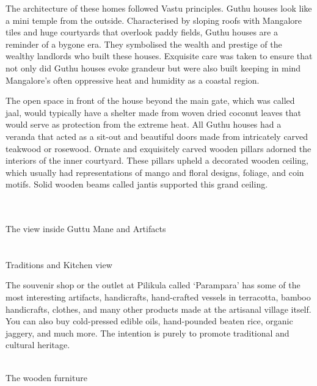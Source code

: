 \documentclass[12pt]{article}
\newcommand{\img}[2]{\scalebox{#1}{\texttt{[image: \#2]}}}
\begin{document}
	\par The architecture of these homes followed Vastu principles. Guthu houses look like a mini temple from the outside. Characterised by sloping roofs with Mangalore tiles and huge courtyards that overlook paddy fields, Guthu houses are a reminder of a bygone era. They symbolised the wealth and prestige of the wealthy landlords who built these houses. Exquisite care was taken to ensure that not only did Guthu houses evoke grandeur but were also built keeping in mind Mangalore’s often oppressive heat and humidity as a coastal region. \newpage

	\par  The open space in front of the house beyond the main gate, which was called jaal, would typically have a shelter made from woven dried coconut leaves that would serve as protection from the extreme heat. All Guthu houses had a veranda that acted as a sit-out and beautiful doors made from intricately carved teakwood or rosewood. Ornate and exquisitely carved wooden pillars adorned the interiors of the inner courtyard. These pillars upheld a decorated wooden ceiling, which usually had representations of mango and floral designs, foliage, and coin motifs. Solid wooden beams called jantis supported this grand ceiling.

	\begin{center}
		\img{.25}{Heritage/Interior-of-Guthu-Mane.jpg} ~ \img{.25}{Heritage/Ancient-Artefacts-at-Guthu-Mane-Pilikula.jpg} \vspace{.5em} \\ \img{.035}{Vishal_Akash.jpg} ~ \img{.03}{Shreyas_Sudhanva.jpg} \\
		The view inside Guttu Mane and Artifacts \\ ~ \\
		\img{.025}{traditional.jpg} ~ \img{.025}{kitchen.jpg} \\
		Traditions and Kitchen view
	\end{center} \newpage

	\par The souvenir shop or the outlet at Pilikula called ‘Parampara’ has some of the most interesting artifacts, handicrafts, hand-crafted vessels in terracotta, bamboo handicrafts, clothes, and many other products made at the artisanal village itself. You can also buy cold-pressed edible oils, hand-pounded beaten rice, organic jaggery, and much more. The intention is purely to promote traditional and cultural heritage.

	\begin{center}
		\img{.025}{Heritage/wooden_part.jpg} ~ \img{.105}{Heritage/wooden_part2.jpg} \\
		The wooden furniture
	\end{center}
\end{document}
